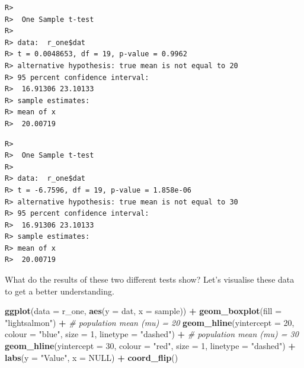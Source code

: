\documentclass[english,10pt,a4paper,oneside]{book}
\newenvironment{Shaded}{\begin{snugshade}}{\end{snugshade}}
\newcommand{\KeywordTok}[1]{\textcolor[rgb]{0.13,0.29,0.53}{\textbf{#1}}}
\newcommand{\DataTypeTok}[1]{\textcolor[rgb]{0.13,0.29,0.53}{#1}}
\newcommand{\DecValTok}[1]{\textcolor[rgb]{0.00,0.00,0.81}{#1}}
\newcommand{\StringTok}[1]{\textcolor[rgb]{0.31,0.60,0.02}{#1}}
\newcommand{\CommentTok}[1]{\textcolor[rgb]{0.56,0.35,0.01}{\textit{#1}}}
\newcommand{\OtherTok}[1]{\textcolor[rgb]{0.56,0.35,0.01}{#1}}
\newcommand{\OperatorTok}[1]{\textcolor[rgb]{0.81,0.36,0.00}{\textbf{#1}}}
\newcommand{\NormalTok}[1]{#1}
\theoremstyle{definition}
\theoremstyle{definition}
\theoremstyle{definition}
\theoremstyle{remark}
\begin{document}
\begin{verbatim}
R> 
R>  One Sample t-test
R> 
R> data:  r_one$dat
R> t = 0.0048653, df = 19, p-value = 0.9962
R> alternative hypothesis: true mean is not equal to 20
R> 95 percent confidence interval:
R>  16.91306 23.10133
R> sample estimates:
R> mean of x 
R>  20.00719
\end{verbatim}

\begin{Shaded}
\end{Shaded}

\begin{verbatim}
R> 
R>  One Sample t-test
R> 
R> data:  r_one$dat
R> t = -6.7596, df = 19, p-value = 1.858e-06
R> alternative hypothesis: true mean is not equal to 30
R> 95 percent confidence interval:
R>  16.91306 23.10133
R> sample estimates:
R> mean of x 
R>  20.00719
\end{verbatim}

What do the results of these two different tests show? Let's visualise
these data to get a better understanding.

\begin{Shaded}
\begin{Highlighting}[]
\KeywordTok{ggplot}\NormalTok{(}\DataTypeTok{data =}\NormalTok{ r_one, }\KeywordTok{aes}\NormalTok{(}\DataTypeTok{y =}\NormalTok{ dat, }\DataTypeTok{x =}\NormalTok{ sample)) }\OperatorTok{+}
\StringTok{  }\KeywordTok{geom_boxplot}\NormalTok{(}\DataTypeTok{fill =} \StringTok{"lightsalmon"}\NormalTok{) }\OperatorTok{+}
\StringTok{  }\CommentTok{# population  mean (mu) = 20}
\StringTok{  }\KeywordTok{geom_hline}\NormalTok{(}\DataTypeTok{yintercept =} \DecValTok{20}\NormalTok{, }\DataTypeTok{colour =} \StringTok{"blue"}\NormalTok{, }
             \DataTypeTok{size =} \DecValTok{1}\NormalTok{, }\DataTypeTok{linetype =} \StringTok{"dashed"}\NormalTok{) }\OperatorTok{+}
\StringTok{  }\CommentTok{# population  mean (mu) = 30}
\StringTok{  }\KeywordTok{geom_hline}\NormalTok{(}\DataTypeTok{yintercept =} \DecValTok{30}\NormalTok{, }\DataTypeTok{colour =} \StringTok{"red"}\NormalTok{, }
             \DataTypeTok{size =} \DecValTok{1}\NormalTok{, }\DataTypeTok{linetype =} \StringTok{"dashed"}\NormalTok{) }\OperatorTok{+}
\StringTok{  }\KeywordTok{labs}\NormalTok{(}\DataTypeTok{y =} \StringTok{"Value"}\NormalTok{, }\DataTypeTok{x =} \OtherTok{NULL}\NormalTok{) }\OperatorTok{+}
\StringTok{  }\KeywordTok{coord_flip}\NormalTok{()}
\end{Highlighting}
\end{Shaded}
\end{document}
